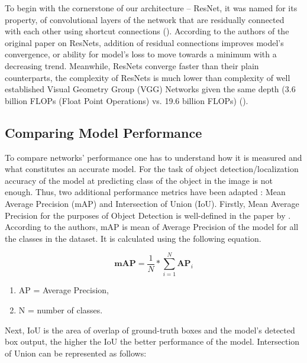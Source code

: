 \documentclass{article}
\begin{document}
To begin with the cornerstone of our architecture -- ResNet, it was named for its property,
of convolutional layers of the network that are residually connected with each other using
shortcut connections ().
According to the authors of the original paper on ResNets,
addition of residual connections improves model's convergence, or ability for
model's loss to move towards a minimum with a decreasing trend. Meanwhile,
ResNets converge faster than their plain counterparts, the complexity of 
ResNets is much lower than complexity of well established Visual Geometry
Group (VGG) Networks given the same depth (3.6 billion FLOPs (Float Point 
Operations) vs. 19.6 billion FLOPs) (). 

\subsection{Comparing Model Performance}
To compare networks' performance one has to understand how it is measured and what
constitutes an accurate model. For the task of object detection/localization accuracy
of the model at predicting class of the object in the image is not enough. Thus,
two additional performance metrics have been adapted : Mean Average Precision (mAP) and
Intersection of Union (IoU). Firstly, Mean Average Precision for the purposes of Object
Detection is well-defined in the paper by . According to the authors,
mAP is mean of Average Precision of the model for all the classes in the dataset. It is
calculated using the following equation.


\begin{equation}
	\textbf{mAP} = \frac{1}{N} * \sum_{i = 1}^{N} \textbf{AP}_i
\end{equation}

\begingroup
\fontsize{7pt}{9pt}\selectfont
\begin{enumerate}
	\item[]  \begin{center} AP = Average Precision, \end{center}
	\item[] \begin{center}  N = number of classes. \end{center}
\end{enumerate}
\endgroup


Next, IoU is the area of overlap of ground-truth boxes and the model's detected box output,
the higher the IoU the better performance of the model. Intersection of Union can be 
represented as follows:
\end{document}
